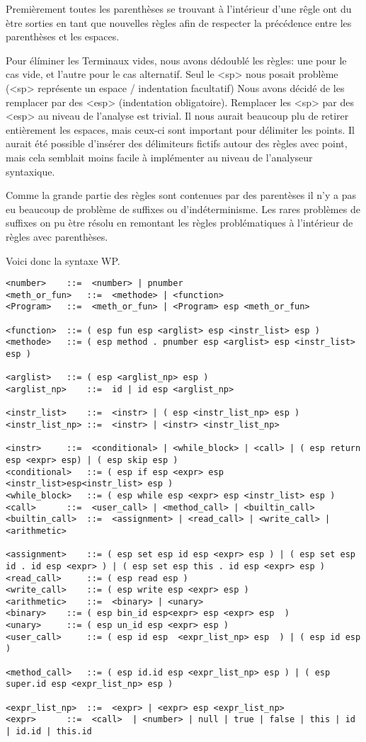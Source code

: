 Premièrement toutes les parenthèses se trouvant à l'intérieur d'une rêgle ont du ètre sorties en
tant que nouvelles règles afin de respecter la précédence entre les parenthèses et les espaces.  

Pour élíminer les Terminaux vides, nous avons dédoublé les règles: une pour le cas vide, et l'autre
pour le cas alternatif. Seul le <sp> nous posait problème (<sp> représente un espace / indentation facultatif)
Nous avons décidé de les remplacer par des <esp> (indentation obligatoire). Remplacer les <sp> par des <esp> au
niveau de l'analyse est trivial. Il nous aurait beaucoup plu de retirer entièrement les espaces, mais ceux-ci
sont important pour délimiter les points. Il aurait été possible d'insérer des délimiteurs fictifs autour
des règles avec point, mais cela semblait moins facile à implémenter au niveau de l'analyseur syntaxique. 

Comme la grande partie des règles sont contenues par des parentèses il n'y a pas eu beaucoup de problème de suffixes
ou d'indéterminisme. Les rares problèmes de suffixes on pu ètre résolu en remontant les règles problématiques
à l'intérieur de règles avec parenthèses. 

Voici donc la syntaxe WP. 
\begin{verbatim}
<number>	::=  <number> | pnumber		
<meth_or_fun> 	::=  <methode> | <function>
<Program> 	::=  <meth_or_fun> | <Program> esp <meth_or_fun>

<function> 	::= ( esp fun esp <arglist> esp <instr_list> esp ) 
<methode> 	::= ( esp method . pnumber esp <arglist> esp <instr_list> esp ) 

<arglist>	::= ( esp <arglist_np> esp )
<arglist_np> 	::=  id | id esp <arglist_np>

<instr_list> 	::=  <instr> | ( esp <instr_list_np> esp ) 
<instr_list_np> ::=  <instr> | <instr> <instr_list_np>

<instr> 	::=  <conditional> | <while_block> | <call> | ( esp return esp <expr> esp) | ( esp skip esp )
<conditional> 	::= ( esp if esp <expr> esp <instr_list>esp<instr_list> esp ) 
<while_block> 	::= ( esp while esp <expr> esp <instr_list> esp ) 
<call> 		::=  <user_call> | <method_call> | <builtin_call> 
<builtin_call> 	::=  <assignment> | <read_call> | <write_call> | <arithmetic>

<assignment> 	::= ( esp set esp id esp <expr> esp ) | ( esp set esp id . id esp <expr> ) | ( esp set esp this . id esp <expr> esp )
<read_call>  	::= ( esp read esp ) 
<write_call> 	::= ( esp write esp <expr> esp )
<arithmetic> 	::=  <binary> | <unary>
<binary> 	::= ( esp bin_id esp<expr> esp <expr> esp  )
<unary>  	::= ( esp un_id esp <expr> esp )
<user_call>  	::= ( esp id esp  <expr_list_np> esp  ) | ( esp id esp ) 

<method_call>  	::= ( esp id.id esp <expr_list_np> esp ) | ( esp super.id esp <expr_list_np> esp ) 

<expr_list_np> 	::=  <expr> | <expr> esp <expr_list_np>
<expr> 		::=  <call>  | <number> | null | true | false | this | id | id.id | this.id
\end{verbatim}
